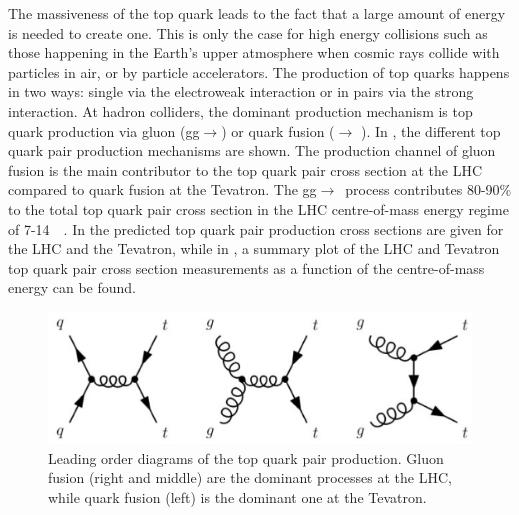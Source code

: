 The massiveness of the top quark leads to the fact that a large amount of energy is needed to create one. This is only the case for high energy collisions such as those happening in the Earth's upper atmosphere when cosmic rays collide with particles in air, or by particle accelerators. The production of top quarks happens in two ways: single via the electroweak interaction or in pairs via the strong interaction. At hadron colliders, the dominant production mechanism is top quark production via gluon (gg$\rightarrow$\ttbar) or quark fusion (\qqbar $\rightarrow$ \ttbar). In , the different top quark pair production mechanisms are shown. The production channel of gluon fusion is the main contributor to the top quark pair cross section at the LHC compared to quark fusion at the Tevatron. %
The gg$\rightarrow$\ttbar\ process contributes 80-90\% to the total top quark pair cross section in the LHC centre-of-mass energy regime of 7-14~\TeV~\cite{PDG}. In  the predicted top quark pair production cross sections are given for the LHC and the Tevatron, while in , a summary plot of the LHC and Tevatron top quark pair cross section measurements as a function of the centre-of-mass energy can be found.
\begin{figure}[htbp]
	\centering
	\includegraphics[width=0.7\linewidth]{1_Introduction/Figures/toppair}
	\caption{Leading order diagrams of the top quark pair production. Gluon fusion (right and middle) are the dominant processes at the LHC, while quark fusion (left) is the dominant one at the Tevatron. }
	\label{fig:toppairproduction}
\end{figure}

